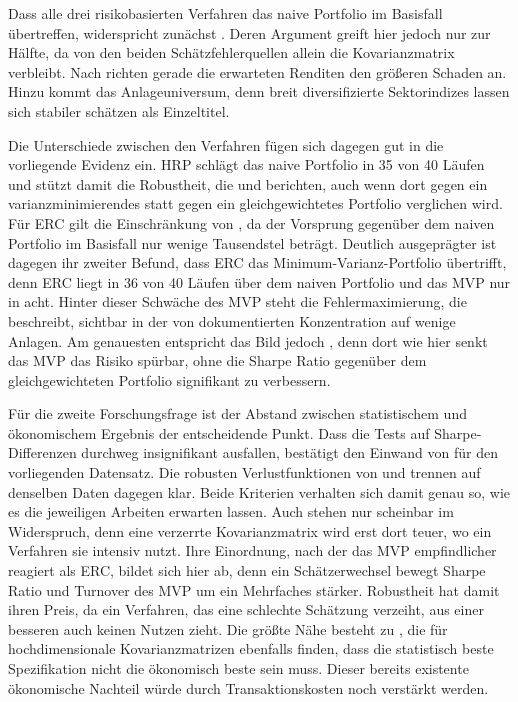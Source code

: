 \documentclass[a4paper, 12pt]{article}
\begin{document}
Dass alle drei risikobasierten Verfahren das naive Portfolio im Basisfall übertreffen, widerspricht zunächst \textcite{demiguel2009}.
Deren Argument greift hier jedoch nur zur Hälfte, da von den beiden Schätzfehlerquellen allein die Kovarianzmatrix verbleibt.
Nach \textcite{broadie1993} richten gerade die erwarteten Renditen den größeren Schaden an.
Hinzu kommt das Anlageuniversum, denn breit diversifizierte Sektorindizes lassen sich stabiler schätzen als Einzeltitel.

Die Unterschiede zwischen den Verfahren fügen sich dagegen gut in die vorliegende Evidenz ein.
HRP schlägt das naive Portfolio in 35 von 40 Läufen und stützt damit die Robustheit, die \textcite{deprado2016} und \textcite{sen2022} berichten, auch wenn dort gegen ein varianzminimierendes statt gegen ein gleichgewichtetes Portfolio verglichen wird.
Für ERC gilt die Einschränkung von \textcite{chaves2011}, da der Vorsprung gegenüber dem naiven Portfolio im Basisfall nur wenige Tausendstel beträgt.
Deutlich ausgeprägter ist dagegen ihr zweiter Befund, dass ERC das Minimum-Varianz-Portfolio übertrifft, denn ERC liegt in 36 von 40 Läufen über dem naiven Portfolio und das MVP nur in acht.
Hinter dieser Schwäche des MVP steht die Fehlermaximierung, die \textcite{michaud1989} beschreibt, sichtbar in der von \textcite{lee2011} dokumentierten Konzentration auf wenige Anlagen.
Am genauesten entspricht das Bild jedoch \textcite{behr2008}, denn dort wie hier senkt das MVP das Risiko spürbar, ohne die Sharpe Ratio gegenüber dem gleichgewichteten Portfolio signifikant zu verbessern.

Für die zweite Forschungsfrage ist der Abstand zwischen statistischem und ökonomischem Ergebnis der entscheidende Punkt.
Dass die Tests auf Sharpe-Differenzen durchweg insignifikant ausfallen, bestätigt den Einwand von \textcite{engle2006} für den vorliegenden Datensatz.
Die robusten Verlustfunktionen von \textcite{patton2011} und \textcite{laurent2013} trennen auf denselben Daten dagegen klar.
Beide Kriterien verhalten sich damit genau so, wie es die jeweiligen Arbeiten erwarten lassen.
Auch \textcite{ardia2017} stehen nur scheinbar im Widerspruch, denn eine verzerrte Kovarianzmatrix wird erst dort teuer, wo ein Verfahren sie intensiv nutzt.
Ihre Einordnung, nach der das MVP empfindlicher reagiert als ERC, bildet sich hier ab, denn ein Schätzerwechsel bewegt Sharpe Ratio und Turnover des MVP um ein Mehrfaches stärker.
Robustheit hat damit ihren Preis, da ein Verfahren, das eine schlechte Schätzung verzeiht, aus einer besseren auch keinen Nutzen zieht.
Die größte Nähe besteht zu \textcite{moura2020}, die für hochdimensionale Kovarianzmatrizen ebenfalls finden, dass die statistisch beste Spezifikation nicht die ökonomisch beste sein muss.
Dieser bereits existente ökonomische Nachteil würde durch Transaktionskosten noch verstärkt werden.
\end{document}
